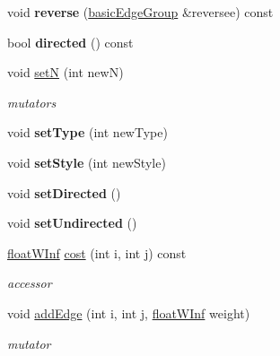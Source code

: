 \begin{DoxyCompactItemize}
\item 
\hypertarget{classbasicEdgeGroup_a8687764e27002e8a7d0c61b379f5a565}{
void {\bfseries reverse} (\hyperlink{classbasicEdgeGroup}{basicEdgeGroup} \&reversee) const }
\label{classbasicEdgeGroup_a8687764e27002e8a7d0c61b379f5a565}

\item 
\hypertarget{classbasicEdgeGroup_a23eddbbe9233f03fe2f69f59a2bbf126}{
bool {\bfseries directed} () const }
\label{classbasicEdgeGroup_a23eddbbe9233f03fe2f69f59a2bbf126}

\item 
\hypertarget{classbasicEdgeGroup_ae365535b5f68a8539dd23f7baac258d2}{
void \hyperlink{classbasicEdgeGroup_ae365535b5f68a8539dd23f7baac258d2}{setN} (int newN)}
\label{classbasicEdgeGroup_ae365535b5f68a8539dd23f7baac258d2}

\begin{DoxyCompactList}\small\item\em mutators \end{DoxyCompactList}\item 
\hypertarget{classbasicEdgeGroup_ae809fdce9d77002e24e45a4a3c812d2a}{
void {\bfseries setType} (int newType)}
\label{classbasicEdgeGroup_ae809fdce9d77002e24e45a4a3c812d2a}

\item 
\hypertarget{classbasicEdgeGroup_ab964e31abeace719e6009b49ffcac1c1}{
void {\bfseries setStyle} (int newStyle)}
\label{classbasicEdgeGroup_ab964e31abeace719e6009b49ffcac1c1}

\item 
\hypertarget{classbasicEdgeGroup_a7b9d2ab029b3fd3ac2eb0f4c94198ecf}{
void {\bfseries setDirected} ()}
\label{classbasicEdgeGroup_a7b9d2ab029b3fd3ac2eb0f4c94198ecf}

\item 
\hypertarget{classbasicEdgeGroup_aadba1c8e14f8975e4525c5e625f25385}{
void {\bfseries setUndirected} ()}
\label{classbasicEdgeGroup_aadba1c8e14f8975e4525c5e625f25385}

\item 
\hypertarget{classbasicEdgeGroup_ab1ad257310158e6ff3ec7039eb5de5a0}{
\hyperlink{classfloatWInf}{floatWInf} \hyperlink{classbasicEdgeGroup_ab1ad257310158e6ff3ec7039eb5de5a0}{cost} (int i, int j) const }
\label{classbasicEdgeGroup_ab1ad257310158e6ff3ec7039eb5de5a0}

\begin{DoxyCompactList}\small\item\em accessor \end{DoxyCompactList}\item 
\hypertarget{classbasicEdgeGroup_aed269cca040aff52afd8c0103819b45c}{
void \hyperlink{classbasicEdgeGroup_aed269cca040aff52afd8c0103819b45c}{addEdge} (int i, int j, \hyperlink{classfloatWInf}{floatWInf} weight)}
\label{classbasicEdgeGroup_aed269cca040aff52afd8c0103819b45c}

\begin{DoxyCompactList}\small\item\em mutator \end{DoxyCompactList}\end{DoxyCompactItemize}


